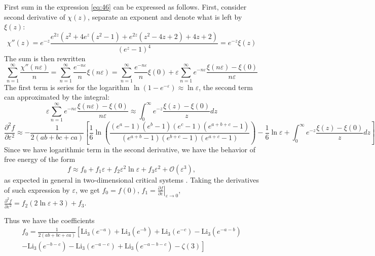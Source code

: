 \documentclass{article}
\newcommand{\Li}{\mathrm{Li}}
\begin{document}
First sum in the expression \eqref{eq:46} can be expressed as follows. First, consider second
derivative of $\chi(z)$, separate an exponent and denote what is left by $\xi(z)$:
\begin{equation}
  \label{eq:48}
  \chi''(z)=e^{-z}\frac{e^{2 z} \left(z^2+4 e^z
   \left(z^2-1\right)+e^{2 z} \left(z^2-4
   z+2\right)+4
   z+2\right)}{\left(e^z-1\right)^4}=e^{-z}\xi(z)
\end{equation}
The sum is then rewritten
\begin{equation}
  \label{eq:49}
  \sum _{n=1}^{\infty} \frac{\chi''(n\varepsilon)}{n}=
  \sum_{n=1}^{\infty}\frac{e^{-n\varepsilon}}{n}\xi(n\varepsilon) =
  \sum_{n=1}^{\infty}\frac{e^{-n\varepsilon}}{n}\xi(0)+  \varepsilon\sum_{n=1}^{\infty}e^{-n\varepsilon}\frac{\xi(n\varepsilon)-\xi(0)}{n\varepsilon}   
\end{equation}
The first term is series for the logarithm $\ln\left(1-e^{-\varepsilon}\right)\approx \ln
\varepsilon$,
the second term can approximated by the integral:
\begin{equation}
  \label{eq:50}
  \varepsilon\sum_{n=1}^{\infty}e^{-n\varepsilon}\frac{\xi(n\varepsilon)-\xi(0)}{n\varepsilon}\approx
  \int_{0}^{\infty} e^{-z}\frac{\xi(z)-\xi(0)}{z} dz
\end{equation}
\begin{equation}
  \label{eq:51}
  \frac{\partial^{2} f}{\partial
  \varepsilon^{2}}\approx-\frac{1}{2(ab+bc+ca)}
\left[\frac{1}{6}\ln\left(\frac{(e^{a}-1)(e^{b}-1)(e^{c}-1)(e^{a+b+c}-1)}{(e^{a+b}-1)(e^{b+c}-1)(e^{a+c}-1)}\right)-\frac{1}{6}\ln \varepsilon+\int_{0}^{\infty} e^{-z}\frac{\xi(z)-\xi(0)}{z} dz\right]
\end{equation}
Since we have logarithmic term in the second derivative, we have the behavior of free energy of the form
\begin{equation}
  \label{eq:26}
  f\approx f_{0}+f_{1}\varepsilon +f_{2}\varepsilon^{2}\ln\varepsilon+ f_{3}\varepsilon^{2}+\mathcal{O}(\varepsilon^{3}),
\end{equation}
as expected in general in two-dimensional critical systems \cite{cardy1988finite}. Taking the
derivatives of such expression by $\varepsilon$, we get $f_{0}=f(0)$,
$f_{1}=\left.\frac{\partial f}{\partial \varepsilon}\right|_{\varepsilon\to 0}$,
$\frac{\partial^{2} f}{\partial \varepsilon^{2}}=f_{2}(2\ln\varepsilon+3)+f_{3}$. 

Thus we have the coefficients
\begin{multline}
  \label{eq:27}
  f_{0}=\frac{1}{2(ab+bc+ca)}\left[\Li_{3}(e^{-a})+\Li_{3}(e^{-b})+\Li_{3}(e^{-c})-
    \Li_{3}(e^{-a-b})\right.\\
  \left.-\Li_{3}(e^{-b-c})-    \Li_{3}(e^{-a-c})+    \Li_{3}(e^{-a-b-c})-\zeta(3)\right]
\end{multline}
\end{document}
